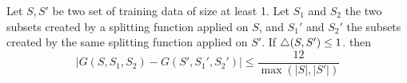\begin{lemma}\label{lem:local_gini_gain_smoothness}
    Let $S, S'$ be two set of training data of size at least 1. Let $S_1$ and $S_2$ the two subsets created by a splitting function applied on $S$, and $S_1'$ and $S_2'$ the subsets created by the same splitting function applied on $S'$. If $\triangle(S, S') \leq 1$. then
    \begin{equation*}
        |G(S, S_1, S_2) - G(S', S_1', S_2')| \leq \frac{12}{\max(|S|, |S'|)}        
    \end{equation*}
\end{lemma}

